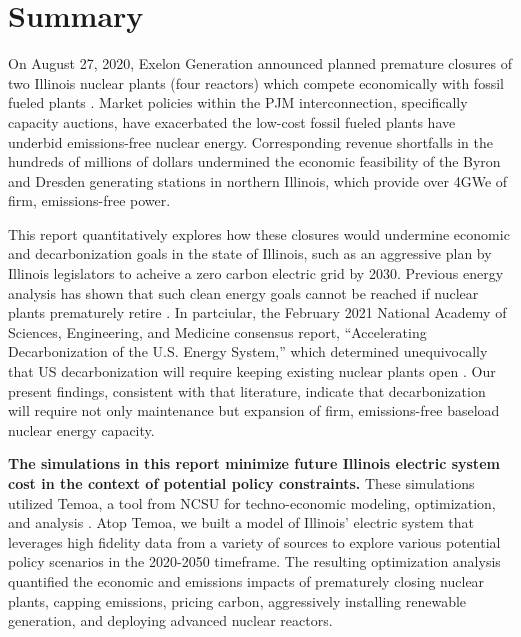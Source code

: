 \section{Summary}
On August 27, 2020, Exelon Generation announced planned premature closures of 
two Illinois nuclear plants (four reactors) which compete economically with 
fossil fueled plants \cite{larson_exelon_2020}. Market policies within the 
\gls{PJM} interconnection, specifically capacity auctions, have exacerbated the low-cost fossil fueled plants have underbid emissions-free nuclear energy. Corresponding revenue shortfalls in the hundreds 
of millions of dollars undermined the economic feasibility of the Byron 
and Dresden generating stations in northern Illinois, which provide over 4GWe 
of firm, emissions-free power.

This report quantitatively explores how these closures would undermine 
economic and decarbonization goals in the state of Illinois, such as an 
aggressive plan by Illinois 
legislators to acheive a zero carbon electric grid by 2030.  Previous energy analysis 
has shown that such clean energy goals cannot be reached if nuclear plants 
prematurely retire 
\cite{national_academies_of_sciences_engineering_and_medicine_2021_accelerating_2021,larson_net-zero_2020,davis_net-zero_2018}.
In partciular, the February 2021 National Academy of Sciences, Engineering, and 
Medicine consensus report, ``Accelerating Decarbonization of the U.S. Energy 
System,'' which determined unequivocally that US decarbonization will require 
keeping existing nuclear plants open 
\cite{national_academies_of_sciences_engineering_and_medicine_2021_accelerating_2021}.
Our present findings, consistent with that literature, indicate that decarbonization will 
require not only maintenance but expansion of firm, emissions-free baseload 
nuclear energy capacity. 


\textbf{The simulations in this report minimize future Illinois electric system 
cost in the context of potential policy constraints.} These simulations 
utilized Temoa, a tool from \gls{NCSU} for techno-economic modeling, 
optimization, and analysis 
\cite{decarolis_temoa_2010,decarolis_temoa_2016,decarolis_formalizing_2017}. 
Atop Temoa, we built a model of 
Illinois' electric system that leverages high fidelity data from a variety of 
sources to explore various potential policy scenarios in the 2020-2050 
timeframe. The resulting optimization analysis quantified the economic and 
emissions impacts of prematurely closing 
nuclear plants, capping emissions, pricing carbon, aggressively installing 
renewable generation, and deploying advanced nuclear reactors.

